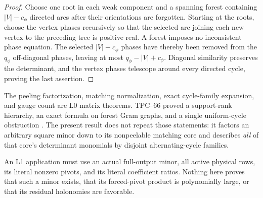\begin{proof}
Choose one root in each weak component and a spanning forest containing
\(|V|-c_\phi\) directed arcs after their orientations are forgotten.
Starting at the roots, choose the vertex phases recursively so that the
selected arc joining each new vertex to the preceding tree is positive
real.  A forest imposes no inconsistent phase equation.  The selected
\(|V|-c_\phi\) phases have thereby been removed from the
\(q_\phi\) off-diagonal phases, leaving at most
\(q_\phi-|V|+c_\phi\).  Diagonal similarity preserves the determinant, and
the vertex phases telescope around every directed cycle, proving the last
assertion.
\end{proof}

\begin{remark}
\label{rem:tpc67-forced-core-L0}
The peeling factorization, matching normalization, exact cycle-family
expansion, and gauge count are L0 matrix theorems.  TPC--66 proved a
support-rank hierarchy, an exact formula on forest Gram graphs, and a
single uniform-cycle obstruction \citep{WangTPC66}.  The present result
does not repeat those statements: it factors an arbitrary square minor down
to its nonpeelable matching core and describes \emph{all} of that core's
determinant monomials by disjoint alternating-cycle families.

An L1 application must use an actual full-output minor, all active physical
rows, its literal nonzero pivots, and its literal coefficient ratios.
Nothing here proves that such a minor exists, that its forced-pivot product
is polynomially large, or that its residual holonomies are favorable.
\end{remark}
